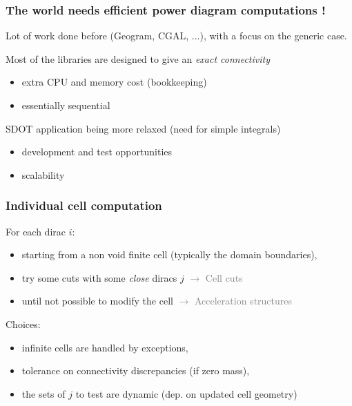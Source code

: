 \documentclass[aspectratio=169]{beamer}
\begin{document}
\begin{frame}
    \frametitle{The world needs efficient power diagram computations !}

    Lot of work done before (Geogram, CGAL, ...), with a focus on the generic case.
    
    \vfill
    Most of the libraries are designed to give an \textit{exact connectivity}
    \begin{itemize}
        \item extra CPU and memory cost (bookkeeping)
        \item essentially sequential
    \end{itemize}

    \vfill
    SDOT application being more relaxed (need for simple integrals)
    \begin{itemize}
        \item development and test opportunities 
        \item scalability
    \end{itemize}
\end{frame}

\begin{frame}
    \frametitle{Individual cell computation}

    For each dirac $i$:
    \begin{itemize}
        \item starting from a non void finite cell (typically the domain boundaries),
        \item try some cuts with some \textit{close} diracs $j$
            \hfill{\textcolor{gray}{$\rightarrow$ Cell cuts}}

        \item until not possible to modify the cell
            \hfill{\textcolor{gray}{$\rightarrow$ Acceleration structures}}
    \end{itemize}
    
    \vfill
    Choices:
    \begin{itemize}
        \item infinite cells are handled by exceptions,
        \item tolerance on connectivity discrepancies (if zero mass),
        \item the sets of $j$ to test are dynamic (dep. on updated cell geometry)
    \end{itemize}
    
\end{frame}

\end{document}
